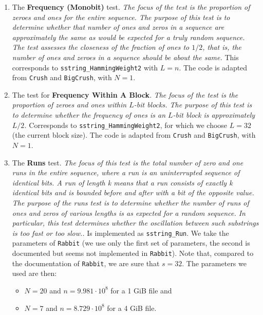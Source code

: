 \endtab

\begin{enumerate}
  \item The {\bf Frequency (Monobit)} test. \textit{The focus of the test is
    the proportion of zeroes and ones for the entire sequence. The purpose of
  this test is to determine whether that number of ones and zeros in a sequence
are approximately the same as would be expected for a truly random sequence. The
test assesses the closeness of the fraction of ones to $1/2$, that is, the number of
ones and zeroes in a sequence should be about the same.} This corresponds to
{\tt sstring\_HammingWeight2} with $L = n$. The code is adapted from {\tt Crush}
and {\tt BigCrush}, with $N=1$.

\item The test for {\bf Frequency Within A Block}. \textit{The
  focus of the test is the proportion of zeroes and ones within $L$-bit blocks.
The purpose of this test is to determine whether the frequency of ones is an
$L$-bit block is approximately $L/2$.} Corresponds to
 {\tt sstring\_HammingWeight2}, for which we choose $L = 32$ (the current block
 size). The code is adapted from {\tt Crush} and {\tt BigCrush}, with $N=1$.

\item The {\bf Runs} test. \textit{The focus of this test is the total number of
  zero and one runs in the entire sequence, where a run is an uninterrupted
sequence of identical bits. A run of length k means that a run consists of
exactly k identical bits and is bounded before and after with a bit of the
opposite value. The purpose of the runs test is to determine whether the number
of runs of ones and zeros of various lengths is as expected for a random
sequence. In particular, this test determines whether the oscillation between
such substrings is too fast or too slow..} Is implemented as {\tt sstring\_Run}.
We take the parameters of {\tt Rabbit} (we use only the first set of parameters,
the second is documented but seems not implemented in {\tt Rabbit}). Note that,
compared to the documentation of {\tt Rabbit}, we are sure that $s=32$.  The
parameters we used are then:
  \begin{itemize}
    \item $N=20$ and $n=9.981\cdot 10^8$ for a 1 GiB file and
    \item $N=7$ and $n=8.729\cdot 10^8$ for a 4 GiB file.
  \end{itemize}


\end{enumerate}
